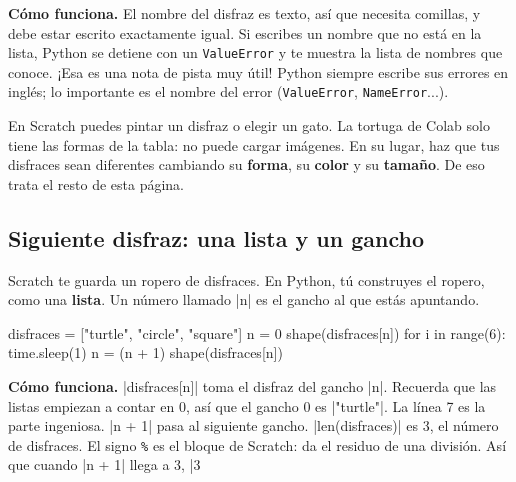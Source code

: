 \textbf{Cómo funciona.} El nombre del disfraz es texto, así que necesita comillas, y debe estar escrito exactamente igual. Si escribes un nombre que no está en la lista, Python se detiene con un \texttt{ValueError} y te muestra la lista de nombres que conoce. ¡Esa es una nota de pista muy útil! Python siempre escribe sus errores en inglés; lo importante es el nombre del error (\texttt{ValueError}, \texttt{NameError}...).

\begin{watchout}
En Scratch puedes pintar un disfraz o elegir un gato. La tortuga de Colab solo tiene las formas de la tabla: no puede cargar imágenes. En su lugar, haz que tus disfraces sean diferentes cambiando su \textbf{forma}, su \textbf{color} y su \textbf{tamaño}. De eso trata el resto de esta página.
\end{watchout}

\subsection*{Siguiente disfraz: una lista y un gancho}

Scratch te guarda un ropero de disfraces. En Python, tú construyes el ropero, como una \textbf{lista}. Un número llamado \py|n| es el gancho al que estás apuntando.

\begin{tcbraster}[raster columns=2, raster equal height=rows, raster column skip=12pt, raster valign=center, raster force size=false, raster column 1/.style={add to width=-2.2cm}, raster column 2/.style={add to width=2.2cm}]
\begin{tcolorbox}[colback=white, colframe=white, boxrule=0pt, valign=center]
\begin{scratch}
\end{scratch}
\end{tcolorbox}
\begin{code}
disfraces = ["turtle", "circle",
             "square"]
n = 0
shape(disfraces[n])
for i in range(6):
    time.sleep(1)
    n = (n + 1) %
    shape(disfraces[n])
\end{code}
\end{tcbraster}

\textbf{Cómo funciona.} \py|disfraces[n]| toma el disfraz del gancho \py|n|. Recuerda que las listas empiezan a contar en 0, así que el gancho 0 es \py|"turtle"|. La línea 7 es la parte ingeniosa. \py|n + 1| pasa al siguiente gancho. \py|len(disfraces)| es 3, el número de disfraces. El signo \texttt{\%} es el bloque  de Scratch: da el residuo de una división. Así que cuando \py|n + 1| llega a 3, \py|3 %

